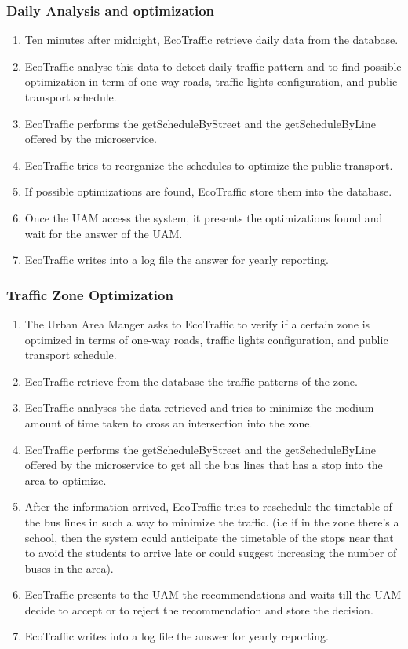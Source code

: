 \documentclass[12pt, a4paper, twoside, openright]{report}
\begin{document}
\subsubsection{Daily Analysis and optimization}\label{subsubsec:daily-analysis}

\begin{enumerate}
\item
  Ten minutes after midnight, EcoTraffic retrieve daily data from the
  database.
\item
  EcoTraffic analyse this data to detect daily traffic pattern and to
  find possible optimization in term of one-way roads, traffic lights
  configuration, and public transport schedule.
\item
  EcoTraffic performs the getScheduleByStreet and the getScheduleByLine
  offered by the microservice.
\item
  EcoTraffic tries to reorganize the schedules to optimize the public
  transport.
\item
  If possible optimizations are found, EcoTraffic store them into the
  database.
\item
  Once the UAM access the system, it presents the optimizations found
  and wait for the answer of the UAM.
\item
  EcoTraffic writes into a log file the answer for yearly reporting.
\end{enumerate}

\subsubsection{Traffic Zone Optimization}\label{subsubsec:traffic-zone}

\begin{enumerate}
\item
  The Urban Area Manger asks to EcoTraffic to verify if a certain zone
  is optimized in terms of one-way roads, traffic lights configuration,
  and public transport schedule.
\item
  EcoTraffic retrieve from the database the traffic patterns of the
  zone.
\item
  EcoTraffic analyses the data retrieved and tries to minimize the
  medium amount of time taken to cross an intersection into the zone.
\item
  EcoTraffic performs the getScheduleByStreet and the getScheduleByLine
  offered by the microservice to get all the bus lines that has a stop
  into the area to optimize.
\item
  After the information arrived, EcoTraffic tries to reschedule the
  timetable of the bus lines in such a way to minimize the traffic. (i.e
  if in the zone there's a school, then the system could anticipate the
  timetable of the stops near that to avoid the students to arrive late
  or could suggest increasing the number of buses in the area).
\item
  EcoTraffic presents to the UAM the recommendations and waits till the
  UAM decide to accept or to reject the recommendation and store the
  decision.
\item
  EcoTraffic writes into a log file the answer for yearly reporting.
\end{enumerate}
\end{document}
